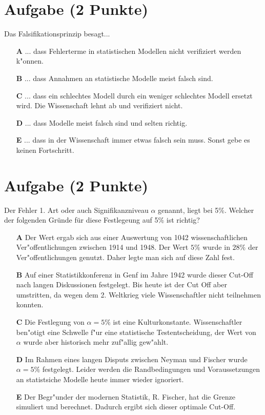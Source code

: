 \documentclass[a4paper, 10pt]{scrartcl}\usepackage[]{graphicx}\usepackage[]{xcolor}
\begin{document}
\section{Aufgabe \hfill (2 Punkte)}

Das Falsifikationsprinzip besagt... 



\begin{enumerate}
\item [\textbf{A} \msquare] ... dass Fehlerterme in statistischen Modellen nicht verifiziert werden k{"o}nnen.
\item [\textbf{B} \msquare] ... dass Annahmen an statistische Modelle meist falsch sind.
\item [\textbf{C} \msquare] ... dass ein schlechtes Modell durch ein weniger schlechtes Modell ersetzt wird. Die Wissenschaft lehnt ab und verifiziert nicht.
\item [\textbf{D} \msquare] ... dass Modelle meist falsch sind und selten richtig.
\item [\textbf{E} \msquare] ... dass in der Wissenschaft immer etwas falsch sein muss. Sonst gebe es keinen Fortschritt.
\end{enumerate}

\section{Aufgabe \hfill (2 Punkte)}

Der Fehler 1. Art oder auch Signifikanzniveau $\alpha$ genannt, liegt bei
5\%. Welcher der folgenden Gr{\"u}nde f{\"u}r diese Festlegeung auf 5\% ist richtig?



\begin{enumerate}
\item [\textbf{A} \msquare] Der Wert ergab sich aus einer Auswertung von 1042 wissenschaftlichen Ver{"o}ffentlichungen zwischen 1914 und 1948. Der Wert $5\%$ wurde in $28\%$ der Ver{"o}ffentlichungen genutzt. Daher legte man sich auf diese Zahl fest.
\item [\textbf{B} \msquare] Auf einer Statistikkonferenz in Genf im Jahre 1942 wurde dieser Cut-Off nach langen Diskussionen festgelegt. Bis heute ist der Cut Off aber umstritten, da wegen dem 2. Weltkrieg viele Wissenschaftler nicht teilnehmen konnten.
\item [\textbf{C} \msquare] Die Festlegung von $\alpha = 5\%$ ist eine Kulturkonstante. Wissenschaftler ben{"o}tigt eine Schwelle f{"u}r eine statistische Testentscheidung, der Wert von $\alpha$ wurde aber historisch mehr zuf{"a}llig gew{"a}hlt.
\item [\textbf{D} \msquare] Im Rahmen eines langen Disputs zwischen Neyman und Fischer wurde $\alpha = 5\%$ festgelegt. Leider werden die Randbedingungen und Voraussetzungen an statistsiche Modelle heute immer wieder ignoriert.
\item [\textbf{E} \msquare] Der Begr{"u}nder der modernen Statistik, R. Fischer, hat die Grenze simuliert und berechnet. Dadurch ergibt sich dieser optimale Cut-Off.
\end{enumerate}
\end{document}
